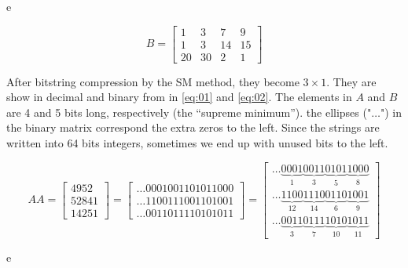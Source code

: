 \documentclass[12pt]{article}
\begin{document}
e

\begin{equation}
	B = \begin{bmatrix}
			1  & 3  & 7 & 9\\ 
			1  &3   & 14 & 15\\ 
			20 & 30 & 2 & 1
		\end{bmatrix}
\end{equation}

After bitstring compression by the SM method, they become $3 \times 1$. They
are show in decimal and binary from in \ref{eq:01} and
\ref{eq:02}. The elements in $A$ and $B$ are 4 and 5 bits long, respectively
(the ``supreme minimum''). the ellipses ("$\ldots$") in the binary matrix
correspond the extra zeros to the left. Since the strings are written into 64
bits integers, sometimes we end up with unused bits to the left.

\begin{equation}\label{eq:01}
	AA = \begin{bmatrix}
			4952\\ 
			52841\\ 
			14251
		\end{bmatrix} 
        =
        \begin{bmatrix}
			\ldots0001001101011000\\ 
			\ldots1100111001101001\\ 
			\ldots0011011110101011
		\end{bmatrix}
        =
        \begin{bmatrix}
\ldots\underbrace{0001}_{1}\underbrace{0011}_{3}\underbrace{0101}_{5}\underbrace
{1000}_{8}\\
\ldots\underbrace{1100}_{12}\underbrace{1110}_{14}\underbrace{0110}_{6}
\underbrace{1001}_{9}\\ 
\ldots\underbrace{0011}_{3}\underbrace{0111}_{7}\underbrace{1010}_{10}
\underbrace{1011}_{11}
		\end{bmatrix}
\end{equation}

e
\end{document}
